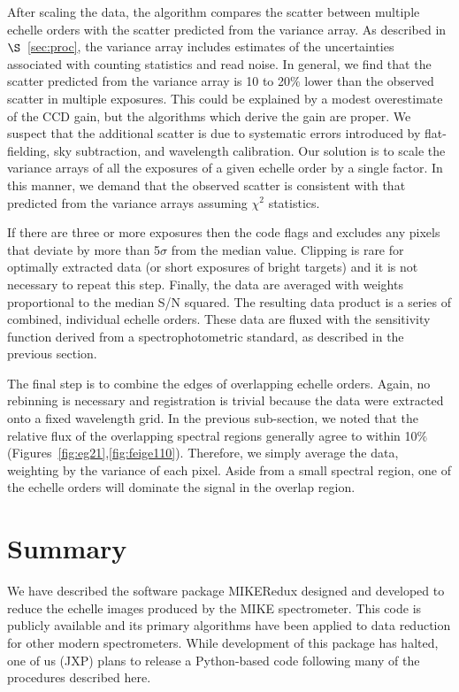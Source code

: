 \documentclass[]{emulateapj}
\begin{document}
After scaling the data, the algorithm compares the scatter
between multiple echelle orders with the scatter predicted from
the variance array.  As described in $\S$~\ref{sec:proc},
the variance array includes
estimates of the uncertainties associated with counting statistics and read noise.
In general, we find that the scatter predicted from the variance array is 
10 to 20$\%$ lower than the observed scatter in multiple exposures.
This could be explained by a modest overestimate of the CCD gain,
but the algorithms which derive the gain are proper.
We suspect that the additional scatter
is due to systematic errors introduced by flat-fielding, 
sky subtraction, and wavelength calibration.  Our solution is to
scale the variance arrays of all the exposures of a given echelle order
by a single factor.  In this manner,  we demand that the 
observed scatter is consistent
with that predicted from the variance arrays assuming $\chi^2$
statistics. 


If there are three or more exposures then the code flags and excludes
any pixels that deviate by more than 5$\sigma$ from the median value.
Clipping is rare for optimally extracted data (or short exposures of bright
targets) and it is not necessary to repeat this step.
Finally, the data are averaged with weights proportional to 
the median S/N squared.
The resulting data product is a series of combined, individual echelle
orders.  These data are fluxed with the sensitivity function derived
from a spectrophotometric standard, as described in the previous section.

The final step is to combine the edges of overlapping echelle orders.
Again, no rebinning is necessary and registration is trivial because
the data were extracted onto a fixed wavelength grid.
In the previous sub-section, we noted that the relative flux of the
overlapping spectral regions generally agree to within 10$\%$
(Figures~\ref{fig:eg21},\ref{fig:feige110}).  Therefore, we simply 
average the data, weighting by the variance of each pixel.
Aside from a small spectral region, one of the echelle orders will
dominate the signal in the overlap region.

\section{Summary}

We have described the software package MIKERedux designed and
developed to reduce the echelle images produced by the MIKE
spectrometer.  This code is publicly available and its primary
algorithms have been applied to data reduction for
other modern spectrometers.   While development of this package has
halted, one of us (JXP) plans to release a Python-based code following
many of the procedures described here.
\end{document}
